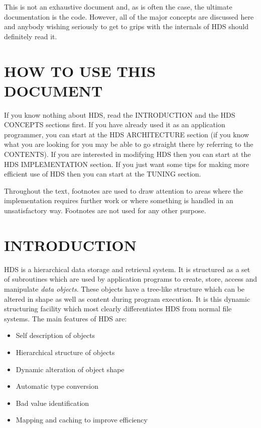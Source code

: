 This is not an exhaustive document and, as is often the case, the ultimate
documentation is the code. However, all of the major concepts are discussed
here and anybody wishing seriously to get to grips with the internals of
HDS should definitely read it.

\section {HOW TO USE THIS DOCUMENT}

If you know nothing about HDS, read the INTRODUCTION and the HDS CONCEPTS
sections first. If you have already used it as an application programmer, you
can start at the HDS ARCHITECTURE section (if you know what you are looking for
you may be able to go straight there by referring to the CONTENTS). If you are
interested in modifying HDS then you can start at the HDS IMPLEMENTATION
section. If you just want some tips for making more efficient use of HDS then
you can start at the TUNING section. 

Throughout the text, footnotes are used to draw attention to areas where
the implementation requires further work or where something is handled in
an unsatisfactory way. Footnotes are not used for any other purpose.

\section {INTRODUCTION}

HDS is a hierarchical data storage and retrieval system. It is structured as a
set of subroutines which are used by application programs to create, store,
access and manipulate {\em data objects}. These objects have a tree-like
structure which can be altered in shape as well as content during program
execution. It is this dynamic structuring facility which most clearly
differentiates HDS from normal file systems. The main features of HDS are: 

\begin {itemize}
\item Self description of objects
\item Hierarchical structure of objects
\item Dynamic alteration of object shape
\item Automatic type conversion
\item Bad value identification
\item Mapping and caching to improve efficiency
\end {itemize}

